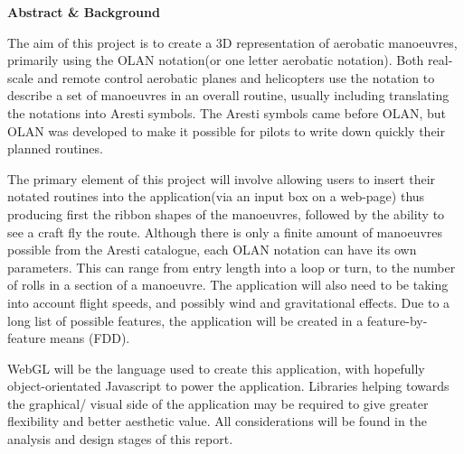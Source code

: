 \thispagestyle{empty}

\begin{center}
{\LARGE\bf Abstract \& Background}
\end{center}

The aim of this project is to create a 3D representation of aerobatic manoeuvres, primarily using the OLAN notation(or one letter aerobatic notation). Both real-scale and remote control aerobatic planes and helicopters use the notation to describe a set of manoeuvres in an overall routine, usually including translating the notations into Aresti symbols. The Aresti symbols came before OLAN, but OLAN was developed to make it possible for pilots to write down quickly their planned routines.

The primary element of this project will involve allowing users to insert their notated routines into the application(via an input box on a web-page) thus producing first the ribbon shapes of the manoeuvres, followed by the ability to see a craft fly the route. Although there is only a finite amount of manoeuvres possible from the Aresti catalogue, each OLAN notation can have its own parameters. This can range from entry length into a loop or turn, to the number of rolls in a section of a manoeuvre. The application will also need to be taking into account flight speeds, and possibly wind and gravitational effects. Due to a long list of possible features, the application will be created in a feature-by-feature means (FDD).

WebGL will be the language used to create this application, with hopefully object-orientated Javascript to power the application. Libraries helping towards the graphical/ visual side of the application may be required to give greater flexibility and better aesthetic value. All considerations will be found in the analysis and design stages of this report.